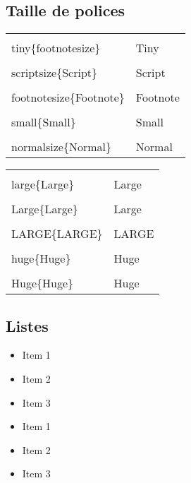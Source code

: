 \documentclass{article}
\begin{document}
\begin{multicols*}{3}
\subsection*{Taille de polices}
\begin{multicols*}{2}
  \begin{tabularx}{\columnwidth}{lX}
    \lstinline{\\tiny\{footnotesize\}} & \tiny{Tiny} \\
    \lstinline{\\scriptsize\{Script\}} & \scriptsize{Script} \\
    \lstinline{\\footnotesize\{Footnote\}} & \footnotesize{Footnote} \\
    \lstinline{\\small\{Small\}} & \small{Small} \\
    \lstinline{\\normalsize\{Normal\}} & \normalsize{Normal} \\
    \end{tabularx}
  \columnbreak
  \begin{tabularx}{\columnwidth}{lX}
    \lstinline{\\large\{Large\}} & \large{Large} \\
    \lstinline{\\Large\{Large\}} & \Large{Large} \\
    \lstinline{\\LARGE\{LARGE\}} & \LARGE{LARGE} \\
    \lstinline{\\huge\{Huge\}} & \huge{Huge} \\
    \lstinline{\\Huge\{Huge\}} & \Huge{Huge} \\
  \end{tabularx}
\end{multicols*}

\subsection*{Listes}
\begin{minipage}[c]{0.3\linewidth}
\begin{itemize}
  \item Item 1
  \item Item 2
  \item Item 3
\end{itemize}
\end{minipage}
\begin{minipage}[c]{0.6\linewidth}
\begin{latexcode}
\begin{itemize}
  \item Item 1
  \item Item 2
  \item Item 3 \label{it:item3}
\end{itemize}
\end{latexcode}
\end{minipage}


\end{multicols*}
\end{document}
